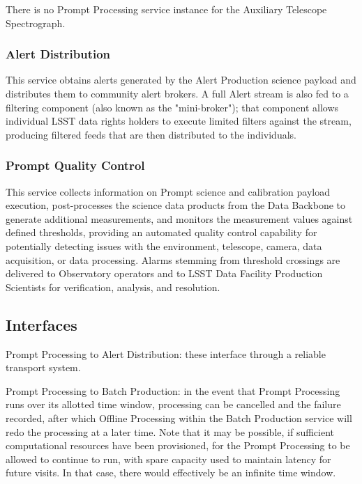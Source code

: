 \documentclass[DM,toc]{lsstdoc}
\begin{document}
There is no Prompt Processing service instance for the Auxiliary
Telescope Spectrograph.

\subsubsection{Alert Distribution}\label{alert-distribution}

This service obtains alerts generated by the Alert Production science payload and distributes them to community alert brokers.
A full Alert stream is also fed to a filtering component (also known as the "mini-broker"); that component allows individual LSST data rights holders to execute limited filters against the stream, producing filtered feeds that are then distributed to the individuals.

\subsubsection{Prompt Quality Control}\label{prompt-quality-control}

This service collects information on Prompt science and calibration
payload execution, post-processes the science data products from the
Data Backbone to generate additional measurements, and monitors the
measurement values against defined thresholds, providing an automated
quality control capability for potentially detecting issues with the
environment, telescope, camera, data acquisition, or data processing.
Alarms stemming from threshold crossings are delivered to Observatory
operators and to LSST Data Facility Production Scientists for
verification, analysis, and resolution.

\subsection{Interfaces}\label{prompt-ncsa-interfaces}

Prompt Processing to Alert Distribution: these
interface through a reliable transport system.

Prompt Processing to Batch Production: in the event that Prompt
Processing runs over its allotted time window, processing can be
cancelled and the failure recorded, after which Offline Processing within
the Batch Production service will
redo the processing at a later time. Note that it may be possible, if
sufficient computational resources have been provisioned, for the Prompt
Processing to be allowed to continue to run, with spare capacity used to
maintain latency for future visits. In that case, there would
effectively be an infinite time window.
\end{document}
